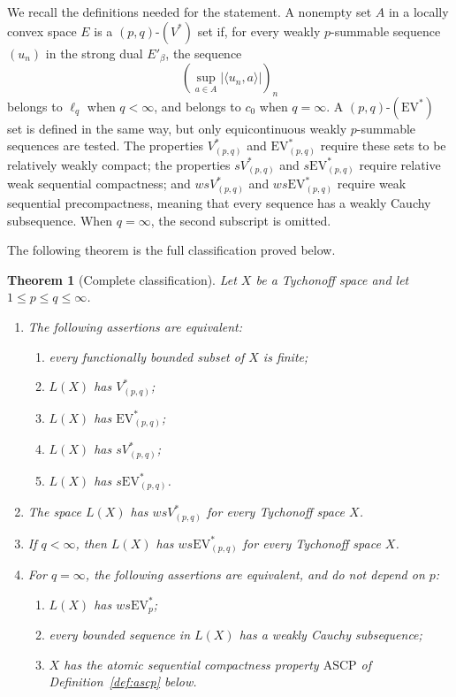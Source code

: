\documentclass[11pt]{article}
\newtheorem{theorem}{Theorem}[section]
\newcommand{\EV}{\mathrm{EV}}
\newcommand{\ASCP}{\mathrm{ASCP}}
\begin{document}
We recall the definitions needed for the statement.  A nonempty set $A$ in a
locally convex space $E$ is a $(p,q)$-$(V^*)$ set if, for every weakly
$p$-summable sequence $(u_n)$ in the strong dual $E'_\beta$, the sequence
\[
  \left(\sup_{a\in A}|\langle u_n,a\rangle|\right)_n
\]
belongs to $\ell_q$ when $q<\infty$, and belongs to $c_0$ when $q=\infty$.
A $(p,q)$-$(\EV^*)$ set is defined in the same way, but only equicontinuous
weakly $p$-summable sequences are tested.  The properties $V^*_{(p,q)}$ and
$\EV^*_{(p,q)}$ require these sets to be relatively weakly compact; the
properties $sV^*_{(p,q)}$ and $s\EV^*_{(p,q)}$ require relative weak sequential
compactness; and $wsV^*_{(p,q)}$ and $ws\EV^*_{(p,q)}$ require weak sequential
precompactness, meaning that every sequence has a weakly Cauchy subsequence.
When $q=\infty$, the second subscript is omitted.

The following theorem is the full classification proved below.

\begin{theorem}[Complete classification]\label{thm:classification}
Let $X$ be a Tychonoff space and let $1\leq p\leq q\leq\infty$.
\begin{enumerate}[label=\textup{(\Roman*)}]
\item\label{cl:strong}
The following assertions are equivalent:
\begin{enumerate}[label=\textup{(\alph*)}]
\item every functionally bounded subset of $X$ is finite;
\item $L(X)$ has $V^*_{(p,q)}$;
\item $L(X)$ has $\EV^*_{(p,q)}$;
\item $L(X)$ has $sV^*_{(p,q)}$;
\item $L(X)$ has $s\EV^*_{(p,q)}$.
\end{enumerate}
\item\label{cl:wsv}
The space $L(X)$ has $wsV^*_{(p,q)}$ for every Tychonoff space $X$.
\item\label{cl:wsevfinite}
If $q<\infty$, then $L(X)$ has $ws\EV^*_{(p,q)}$ for every Tychonoff space $X$.
\item\label{cl:endpoint}
For $q=\infty$, the following assertions are equivalent, and do not depend on
$p$:
\begin{enumerate}[label=\textup{(\alph*)}]
\item $L(X)$ has $ws\EV^*_p$;
\item every bounded sequence in $L(X)$ has a weakly Cauchy subsequence;
\item $X$ has the atomic sequential compactness property $\ASCP$ of
Definition~\ref{def:ascp} below.
\end{enumerate}
\end{enumerate}
\end{theorem}
\end{document}
